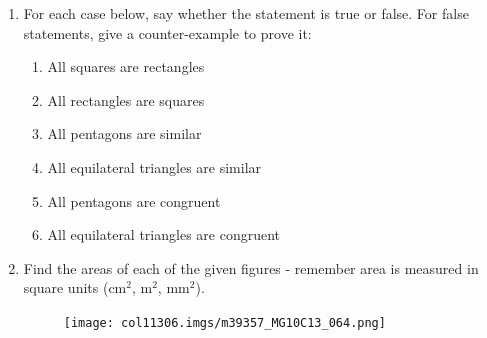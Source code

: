           \label{m39357*id319959}\begin{enumerate}[noitemsep, label=\textbf{\arabic*}. ] 
            \label{m39357*uid104}\item For each case below, say whether the statement is true or false. For false statements, give a counter-example to prove it:
\label{m39357*id319975}\begin{enumerate}[noitemsep, label=\textbf{\alph*}. ] 
            \label{m39357*uid10566}\item All squares are rectangles
\label{m39357*uid10666}\item All rectangles are squares
\label{m39357*uid10766}\item All pentagons are similar
\label{m39357*uid10866}\item All equilateral triangles are similar
\label{m39357*uid10966}\item All pentagons are congruent
\label{m39357*uid11066}\item All equilateral triangles are congruent
\end{enumerate}
                \label{m39357*uid111666}\item Find the areas of each of the given figures - remember area is measured in square units (cm${}^{2}$, m\begin{math}{}^{2}\end{math}, mm\begin{math}{}^{2}\end{math}).

    \setcounter{subfigure}{0}


	\begin{figure}[H] %
    \begin{center}
    \label{m39357*id320109!!!underscore!!!media}\label{m39357*id320109!!!underscore!!!printimage}\texttt{[image: col11306.imgs/m39357\_MG10C13\_064.png]} %
        
      \vspace{2pt}
    \vspace{.1in}
    
    \end{center}

 \end{figure}   

    \addtocounter{footnote}{-0}
            \end{enumerate}
        
          

        
      

